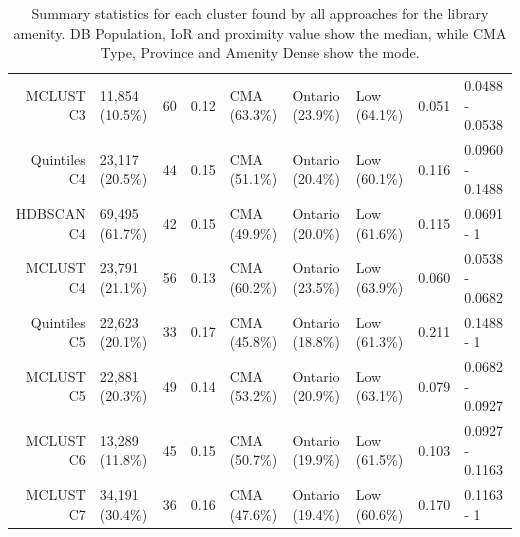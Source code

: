 \documentclass[11pt, a4paper]{article}
\begin{document}
\begin{table}[H]
{\begin{tabular}{|r|llllllll|}
  MCLUST C3 & 11,854 (10.5\%) & 60 & 0.12 & CMA (63.3\%) & Ontario (23.9\%) & Low (64.1\%) & 0.051 & 0.0488 - 0.0538 \\ 
  Quintiles C4 & 23,117 (20.5\%) & 44 & 0.15 & CMA (51.1\%) & Ontario (20.4\%) & Low (60.1\%) & 0.116 & 0.0960 - 0.1488 \\ 
  HDBSCAN C4 & 69,495 (61.7\%) & 42 & 0.15 & CMA (49.9\%) & Ontario (20.0\%) & Low (61.6\%) & 0.115 & 0.0691 - 1 \\ 
  MCLUST C4 & 23,791 (21.1\%) & 56 & 0.13 & CMA (60.2\%) & Ontario (23.5\%) & Low (63.9\%) & 0.060 & 0.0538 - 0.0682 \\ 
  Quintiles C5 & 22,623 (20.1\%) & 33 & 0.17 & CMA (45.8\%) & Ontario (18.8\%) & Low (61.3\%) & 0.211 & 0.1488 - 1 \\ 
  MCLUST C5 & 22,881 (20.3\%) & 49 & 0.14 & CMA (53.2\%) & Ontario (20.9\%) & Low (63.1\%) & 0.079 & 0.0682 - 0.0927 \\ 
  MCLUST C6 & 13,289 (11.8\%) & 45 & 0.15 & CMA (50.7\%) & Ontario (19.9\%) & Low (61.5\%) & 0.103 & 0.0927 - 0.1163 \\ 
  MCLUST C7 & 34,191 (30.4\%) & 36 & 0.16 & CMA (47.6\%) & Ontario (19.4\%) & Low (60.6\%) & 0.170 & 0.1163 - 1 \\ 
   \hline
\end{tabular}
}
\caption[Library cluster profiles]{Summary statistics for each cluster found by all approaches for the library amenity. DB Population, IoR and proximity value show the median, while CMA Type, Province and Amenity Dense show the mode.}\label{libraryprofiles}
\end{table}
\end{document}
